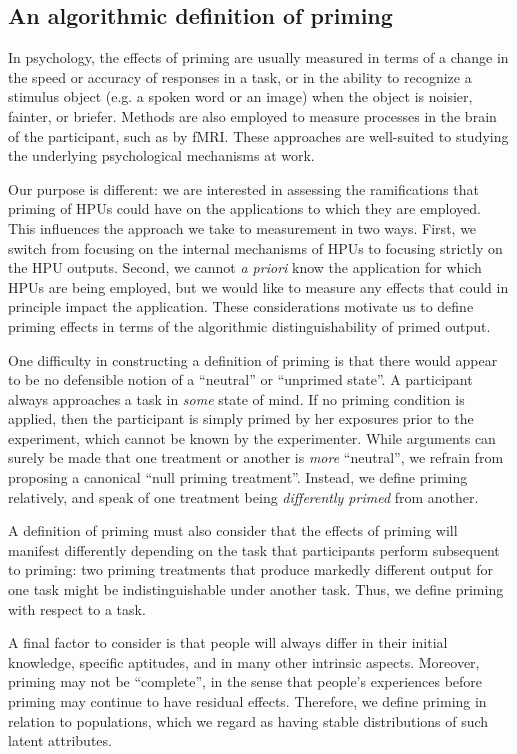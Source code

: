 \documentclass[letterpaper,twocolumn]{article}
\begin{document}
\subsection*{An algorithmic definition of priming}

In psychology, the effects of priming are usually measured in terms of a 
change in the  
speed or accuracy of responses in a task, or in the ability to recognize a 
stimulus object (e.g. a spoken word or an image) when the object is noisier, 
fainter, or briefer.  Methods are also employed to measure processes
in the brain of the participant, such as by fMRI.  These approaches are 
well-suited to studying the underlying psychological mechanisms at work.

Our purpose is different: we are interested in assessing the ramifications
that priming of HPUs could have on the applications to which they are employed.
This influences the approach we take to measurement in two ways.  First, we 
switch from focusing on the internal mechanisms of HPUs to focusing strictly 
on the HPU outputs.  Second, we cannot \textit{a priori} know the 
application for which HPUs are being employed, but we would like to measure 
any effects that could in principle impact the application.  These 
considerations motivate us to define priming effects in terms of the 
algorithmic distinguishability of primed output.

One difficulty in constructing a definition of priming is that there would 
appear to be no defensible notion of a ``neutral'' or ``unprimed state''.  A 
participant 
always approaches a task in \textit{some} state of mind.  If no priming 
condition is applied, then the participant is simply primed by her
exposures prior to the experiment, which cannot be known by the experimenter.  
While arguments can surely be made that one treatment or another is 
\textit{more} 
``neutral'', we refrain from proposing a canonical ``null priming treatment''. 
Instead, we define priming relatively, and speak of one treatment being 
\textit{differently primed} from another.

A definition of priming must also consider that the effects of priming will
manifest differently depending on the task that participants perform 
subsequent to priming:  two priming treatments that
produce markedly different output for one task might be 
indistinguishable under another task.  Thus, we define priming
with respect to a task.

A final factor to consider is that people will always differ in their initial
knowledge, specific aptitudes, and in many other intrinsic aspects.  Moreover,
priming may not be ``complete'', in the sense that people's experiences before
priming may continue to have residual effects.  Therefore, we define priming 
in relation to populations, which we regard as having stable distributions of
such latent attributes.
\end{document}
